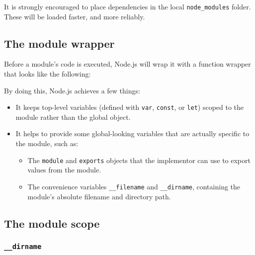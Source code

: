 It is strongly encouraged to place dependencies in the local
\texttt{node\_modules} folder. These will be loaded faster, and more
reliably.

\subsection{The module wrapper}\label{the-module-wrapper}

Before a module's code is executed, Node.js will wrap it with a function
wrapper that looks like the following:

\begin{Shaded}
\begin{Highlighting}[]
\NormalTok{(}\OperatorTok{,}\OperatorTok{,}\OperatorTok{,} \OperatorTok{,} \NormalTok{) \{}
\NormalTok{\})}\OperatorTok{;}
\end{Highlighting}
\end{Shaded}

By doing this, Node.js achieves a few things:

\begin{itemize}
\tightlist
\item
  It keeps top-level variables (defined with \texttt{var},
  \texttt{const}, or \texttt{let}) scoped to the module rather than the
  global object.
\item
  It helps to provide some global-looking variables that are actually
  specific to the module, such as:

  \begin{itemize}
  \tightlist
  \item
    The \texttt{module} and \texttt{exports} objects that the
    implementor can use to export values from the module.
  \item
    The convenience variables \texttt{\_\_filename} and
    \texttt{\_\_dirname}, containing the module's absolute filename and
    directory path.
  \end{itemize}
\end{itemize}

\subsection{The module scope}\label{the-module-scope}

\subsubsection{\texorpdfstring{\texttt{\_\_dirname}}{\_\_dirname}}\label{dirname}


